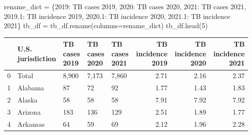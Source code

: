 \documentclass[
  letterpaper,
  DIV=11,
  numbers=noendperiod]{scrreprt}
\newenvironment{Shaded}{\begin{snugshade}}{\end{snugshade}}
\newcommand{\DecValTok}[1]{\textcolor[rgb]{0.68,0.00,0.00}{#1}}
\newcommand{\NormalTok}[1]{\textcolor[rgb]{0.00,0.23,0.31}{#1}}
\newcommand{\OperatorTok}[1]{\textcolor[rgb]{0.37,0.37,0.37}{#1}}
\newcommand{\StringTok}[1]{\textcolor[rgb]{0.13,0.47,0.30}{#1}}
\begin{document}
\begin{Shaded}
\begin{Highlighting}[]
\NormalTok{rename\_dict }\OperatorTok{=}\NormalTok{ \{}\StringTok{\textquotesingle{}2019\textquotesingle{}}\NormalTok{: }\StringTok{\textquotesingle{}TB cases 2019\textquotesingle{}}\NormalTok{,}
               \StringTok{\textquotesingle{}2020\textquotesingle{}}\NormalTok{: }\StringTok{\textquotesingle{}TB cases 2020\textquotesingle{}}\NormalTok{,}
               \StringTok{\textquotesingle{}2021\textquotesingle{}}\NormalTok{: }\StringTok{\textquotesingle{}TB cases 2021\textquotesingle{}}\NormalTok{,}
               \StringTok{\textquotesingle{}2019.1\textquotesingle{}}\NormalTok{: }\StringTok{\textquotesingle{}TB incidence 2019\textquotesingle{}}\NormalTok{,}
               \StringTok{\textquotesingle{}2020.1\textquotesingle{}}\NormalTok{: }\StringTok{\textquotesingle{}TB incidence 2020\textquotesingle{}}\NormalTok{,}
               \StringTok{\textquotesingle{}2021.1\textquotesingle{}}\NormalTok{: }\StringTok{\textquotesingle{}TB incidence 2021\textquotesingle{}}\NormalTok{\}}
\NormalTok{tb\_df }\OperatorTok{=}\NormalTok{ tb\_df.rename(columns}\OperatorTok{=}\NormalTok{rename\_dict)}
\NormalTok{tb\_df.head(}\DecValTok{5}\NormalTok{)}
\end{Highlighting}
\end{Shaded}

\begin{tabular}{lllllrrr}
\toprule
{} & U.S. jurisdiction & TB cases 2019 & TB cases 2020 & TB cases 2021 &  TB incidence 2019 &  TB incidence 2020 &  TB incidence 2021 \\
\midrule
0 &             Total &         8,900 &         7,173 &         7,860 &               2.71 &               2.16 &               2.37 \\
1 &           Alabama &            87 &            72 &            92 &               1.77 &               1.43 &               1.83 \\
2 &            Alaska &            58 &            58 &            58 &               7.91 &               7.92 &               7.92 \\
3 &           Arizona &           183 &           136 &           129 &               2.51 &               1.89 &               1.77 \\
4 &          Arkansas &            64 &            59 &            69 &               2.12 &               1.96 &               2.28 \\
\bottomrule
\end{tabular}
\end{document}
